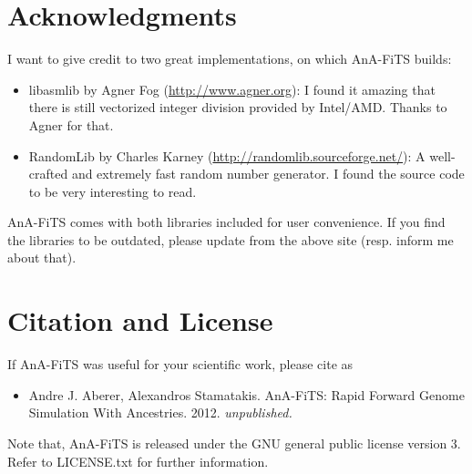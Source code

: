 \documentclass{scrartcl}
\begin{document}
\section{ Acknowledgments }
\label{sec:acknowledgements}

I want to give credit to two great implementations, on which AnA-FiTS
builds: 

\begin{itemize}
\item libasmlib by Agner Fog (\url{http://www.agner.org}): I found it amazing
  that there is still vectorized integer division provided by
  Intel/AMD. Thanks to Agner for that.
\item RandomLib by Charles Karney
  (\url{http://randomlib.sourceforge.net/}): A well-crafted and
  extremely fast random number generator. I found the source code to
  be very interesting to read. 
\end{itemize}

AnA-FiTS comes with both libraries included for user convenience. If
you find the libraries to be outdated, please update from the above
site (resp. inform me about that). 

\section{Citation and License }
\label{sec:citation}

If AnA-FiTS was useful for your scientific work, please cite as 

\begin{itemize}
\item Andre J. Aberer, Alexandros Stamatakis. AnA-FiTS: Rapid Forward
  Genome Simulation With Ancestries. 2012. \textit{unpublished.}
\end{itemize}


\noindent Note that, AnA-FiTS is released under the GNU general public
license version 3. Refer to LICENSE.txt for further information. 
\end{document}
